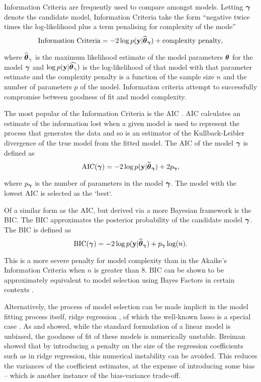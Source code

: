 
Information Criteria are frequently used to compare amongst models. Letting
${\boldsymbol \gamma}$ denote the candidate model, Information Criteria take the form
``negative twice times the log-likelihood plus a term penalising for complexity
of the mode''
$$
	\text{Information Criteria} = -2 \log p({\bf y} | \widehat{{\boldsymbol \theta}}_{\boldsymbol \gamma}) + \text{complexity penalty},
$$

\noindent where $\widehat{{\boldsymbol \theta}}_{\gamma}$ is the maximum likelihood estimate of
the model parameters ${\boldsymbol \theta}$ for the model ${\boldsymbol \gamma}$ and $\log p({\bf y} |
\widehat{{\boldsymbol \theta}_\gamma})$ is the log-likelihood of that model with that
parameter estimate and the complexity penalty is a function of the sample size
$n$ and the number of parameters $p$ of the model. Information criteria attempt
to successfully compromise between goodness of fit and model complexity.

The most popular of the Information Criteria is the 
AIC \citep{Akaike1974}. AIC calculates an estimate of the information lost
when a given model is used to represent the process that generates the data and
so is an estimator of the Kullback-Leibler divergence of the true model from the
fitted model. The AIC of the model ${\boldsymbol \gamma}$ is defined as
$$
	\text{AIC}({\boldsymbol \gamma}) = -2 \log p({\bf y} | \widehat{{\boldsymbol \theta}}_{\boldsymbol \gamma}) + 2 p_{\boldsymbol \gamma},
$$

\noindent where $p_{\boldsymbol \gamma}$ is the number of parameters in the model ${\boldsymbol \gamma}$.
The model with the lowest AIC is selected as the `best`.

Of a similar form as the AIC, but derived via a more Bayesian framework is the
BIC. The BIC approximates the posterior
probability of the candidate model ${\boldsymbol \gamma}$. The BIC is defined as
$$
	\text{BIC}({\boldsymbol \gamma}) = -2 \log p({\bf y} | \widehat{{\boldsymbol \theta}}_{\boldsymbol \gamma}) + p_{\boldsymbol \gamma} \log(n).
$$

\noindent This is a more severe penalty for model complexity than in the
Akaike's Information Criteria when $n$ is greater than $8$. BIC can be shown to
be approximately equivalent to model selection using Bayes Factors in certain
contexts \citep{Kass1993}.

Alternatively, the process of model selection can be made implicit in the model fitting
process itself, ridge regression \citep{Casella1980}, of which the well-known
lasso is a special case \citep{Tibshirani1996}. As \cite{Breiman1996} and
\cite{Efron2013} showed, while  the standard formulation of a linear model is
unbiased, the goodness of fit of these models is numerically  unstable. Breiman
showed that by introducing a penalty on the size of the regression coefficients
such as  in ridge regression, this numerical instability can be avoided. This
reduces the variances of the coefficient estimates, at the expense of
introducing some bias -- which is another instance of the bias-variance
trade-off.

